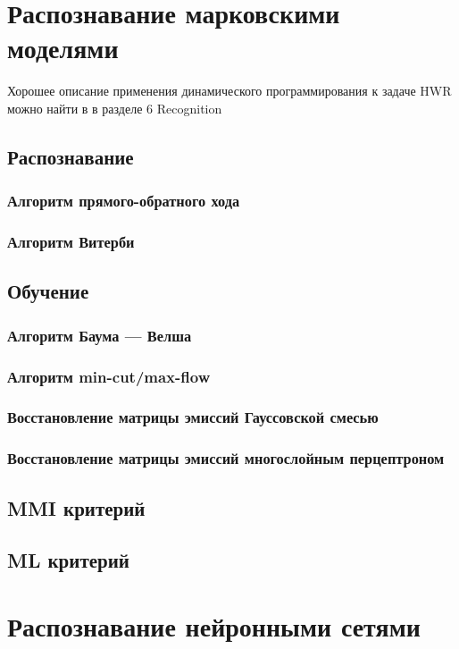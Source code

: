 \section{Распознавание марковскими моделями}

Хорошее описание применения динамического программирования к задаче HWR можно найти в \cite{kim1997lexicon} в разделе 6 Recognition

\subsection{Распознавание}
\subsubsection{Алгоритм прямого-обратного хода}
\subsubsection{Алгоритм Витерби}
\subsection{Обучение}
\cite{tay2002offline}

\subsubsection{Алгоритм Баума — Велша}
\subsubsection{Алгоритм min-cut/max-flow}
\subsubsection{Восстановление матрицы эмиссий Гауссовской смесью}
\subsubsection{Восстановление матрицы эмиссий многослойным перцептроном}
\subsection{MMI критерий}
\subsection{ML критерий}

\section{Распознавание нейронными сетями}
\cite{Panwar}
